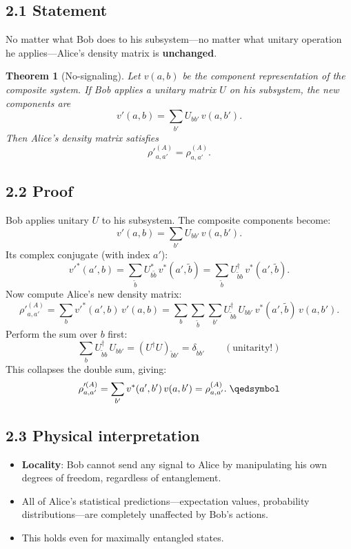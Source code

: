 \documentclass[12pt,a4paper]{article}
\newtheorem{theorem}{Theorem}
\begin{document}
\subsection{2.1 Statement}
No matter what Bob does to his subsystem---no matter what unitary operation he applies---Alice's density matrix is \textbf{unchanged}.

\begin{theorem}[No-signaling]
Let $v(a,b)$ be the component representation of the composite system.  If Bob applies a unitary matrix $U$ on his subsystem, the new components are
\[
    v'(a,b) = \sum_{b'} U_{bb'}\,v(a,b').
\]
Then Alice's density matrix satisfies
\[
    \rho'^{(A)}_{a,a'} = \rho^{(A)}_{a,a'}.
\]
\end{theorem}

\subsection{2.2 Proof}
Bob applies unitary $U$ to his subsystem.  The composite components become:
\[
    v'(a,b) = \sum_{b'} U_{bb'}\,v(a,b').
\]
Its complex conjugate (with index $a'$):
\[
    v'^*(a',b) = \sum_{\tilde{b}} U^*_{b\tilde{b}}\,v^*(a',\tilde{b}) = \sum_{\tilde{b}} U^\dagger_{\tilde{b}b}\,v^*(a',\tilde{b}).
\]
Now compute Alice's new density matrix:
\[
    \rho'^{(A)}_{a,a'} = \sum_b v'^*(a',b)\,v'(a,b)
    = \sum_b \sum_{\tilde{b}} \sum_{b'} U^\dagger_{\tilde{b}b}\,U_{bb'}\,v^*(a',\tilde{b})\,v(a,b').
\]
Perform the sum over $b$ first:
\[
    \sum_b U^\dagger_{\tilde{b}b}\,U_{bb'} = (U^\dagger U)_{\tilde{b}b'} = \delta_{\tilde{b}b'} \qquad (\text{unitarity!})
\]
This collapses the double sum, giving:
\[
    \rho'^{(A)}_{a,a'} = \sum_{b'} v^*(a',b')\,v(a,b') = \rho^{(A)}_{a,a'}.\;\qedsymbol
\]

\subsection{2.3 Physical interpretation}
\begin{itemize}[nosep]
    \item \textbf{Locality}: Bob cannot send any signal to Alice by manipulating his own degrees of freedom, regardless of entanglement.
    \item All of Alice's statistical predictions---expectation values, probability distributions---are completely unaffected by Bob's actions.
    \item This holds even for maximally entangled states.
\end{itemize}
\end{document}
